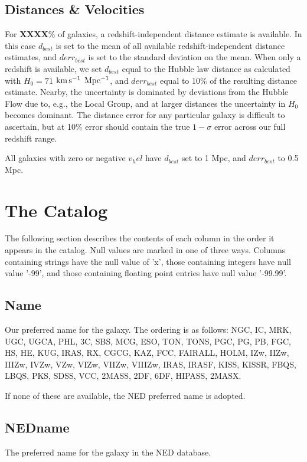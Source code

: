 \documentclass[iop]{emulateapj-rtx4}
\newcommand{\kms}{$\rm km\, s^{-1}$}
\begin{document}
\subsection{Distances \& Velocities}
For \textbf{XXXX}\% of galaxies, a redshift-independent distance estimate is available. In this case $d_{best}$ is set to the mean of all available redshift-independent distance estimates, and $derr_{best}$ is set to the standard deviation on the mean. When only a redshift is available, we set $d_{best}$ equal to the Hubble law distance as calculated with $H_0 = 71$ \kms $~\rm Mpc^{-1}$, and $derr_{best}$ equal to 10\% of the resulting distance estimate. Nearby, the uncertainty is dominated by deviations from the Hubble Flow due to, e.g., the Local Group, and at larger distances the uncertainty in $H_0$ becomes dominant. The distance error for any particular galaxy is difficult to ascertain, but at 10\% error should contain the true $1-\sigma$ error across our full redshift range.

All galaxies with zero or negative $v_hel$ have $d_{best}$ set to 1 Mpc, and $derr_{best}$ to 0.5 Mpc. 


\section{The Catalog}
The following section describes the contents of each column in the order it appears in the catalog. Null values are marked in one of three ways. Columns containing strings have the null value of 'x', those containing integers have null value '-99', and those containing floating point entries have null value '-99.99'.

\subsection{Name}
Our preferred name for the galaxy. The ordering is as follows: NGC, IC, MRK, UGC, UGCA, PHL, 3C, SBS, MCG, ESO, TON, TONS, PGC, PG, PB, FGC, HS, HE, KUG, IRAS, RX, CGCG, KAZ, FCC, FAIRALL, HOLM, IZw, IIZw, IIIZw, IVZw, VZw, VIZw, VIIZw, VIIIZw, IRAS, IRASF, KISS, KISSR, FBQS, LBQS, PKS, SDSS, VCC, 2MASS, 2DF, 6DF, HIPASS, 2MASX.


If none of these are available, the NED preferred name is adopted.

\subsection{NEDname}
The preferred name for the galaxy in the NED database.
\end{document}
